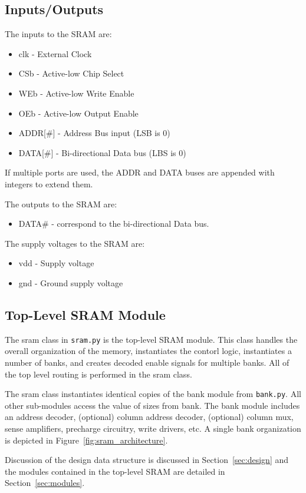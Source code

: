 \subsection{Inputs/Outputs}
\label{sec:io}

The inputs to the SRAM are: 
\begin{itemize}
\setlength{\itemsep}{0pt}
\item clk - External Clock
\item CSb - Active-low Chip Select
\item WEb - Active-low Write Enable
\item OEb - Active-low Output Enable
\item ADDR[\#] - Address Bus input (LSB is 0)
\item DATA[\#] - Bi-directional Data bus (LBS is 0)
\end{itemize}
If multiple ports are used, the ADDR and DATA buses are appended with
integers to extend them.

The outputs to the SRAM are: 
\begin{itemize}
\setlength{\itemsep}{0pt}
\item DATA\# - correspond to the bi-directional Data bus.
\end{itemize}

The supply voltages to the SRAM are:
\begin{itemize}
\item vdd - Supply voltage
\item gnd - Ground supply voltage
\end{itemize}

\subsection{Top-Level SRAM Module}
\label{sec:sram}

The sram class in \verb|sram.py| is the top-level SRAM module.  This
class handles the overall organization of the memory, instantiates the
contorl logic, instantiates a number of banks, and creates decoded
enable signals for multiple banks. All of the top level routing is
performed in the sram class.


The sram class instantiates identical copies of the bank module from
\verb|bank.py|.  All other sub-modules access the value of sizes from
bank.  The bank module includes an address decoder, (optional) column
address decoder, (optional) column mux, sense amplifiers, precharge
circuitry, write drivers, etc.  A single bank organization is depicted
in Figure~\ref{fig:sram_architecture}.

Discussion of the design data structure is discussed in
Section~\ref{sec:design} and the modules contained in the top-level
SRAM are detailed in Section~\ref{sec:modules}.


